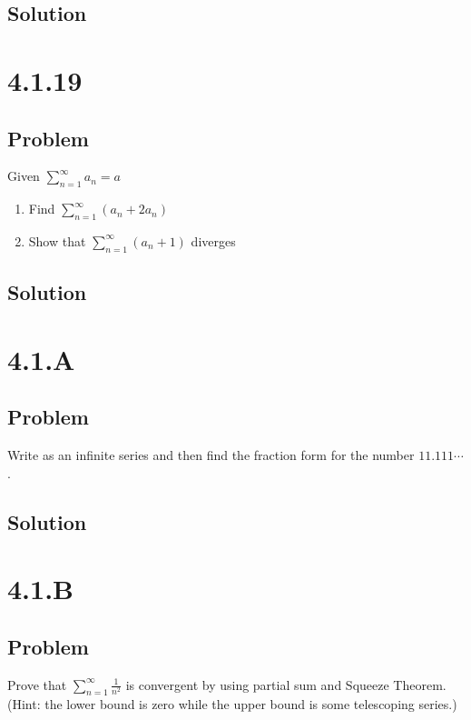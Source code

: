 \documentclass[12pt]{article}
\begin{document}
\subsection*{Solution}



\section*{4.1.19}

\subsection*{Problem}
Given $\sum_{n = 1}^\infty a_n = a$
\begin{enumerate}
    \item Find $\sum_{n = 1}^\infty (a_n + 2a_n)$
    \item Show that $\sum_{n = 1}^\infty (a_n + 1)$ diverges
\end{enumerate}

\subsection*{Solution}



\section*{4.1.A}

\subsection*{Problem}
Write as an infinite series and then find the fraction form for the number $11.111\cdots$.

\subsection*{Solution}



\section*{4.1.B}

\subsection*{Problem}
Prove that $\sum_{n=1}^\infty \frac{1}{n^2}$ is convergent by using partial sum and Squeeze Theorem. (Hint: the lower bound is zero while the upper bound is some telescoping series.)
\end{document}
